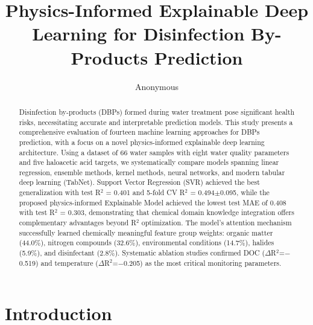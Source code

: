 \documentclass[runningheads]{llncs}
\begin{document}
\title{Physics-Informed Explainable Deep Learning for Disinfection By-Products Prediction}


\author{Anonymous}



\maketitle

\begin{abstract}
Disinfection by-products (DBPs) formed during water treatment pose significant health risks, necessitating accurate and interpretable prediction models. This study presents a comprehensive evaluation of fourteen machine learning approaches for DBPs prediction, with a focus on a novel physics-informed explainable deep learning architecture. Using a dataset of 66 water samples with eight water quality parameters and five haloacetic acid targets, we systematically compare models spanning linear regression, ensemble methods, kernel methods, neural networks, and modern tabular deep learning (TabNet). Support Vector Regression (SVR) achieved the best generalization with test R$^2$ = 0.401 and 5-fold CV R$^2$ = 0.494$\pm$0.095, while the proposed physics-informed Explainable Model achieved the lowest test MAE of 0.408 with test R$^2$ = 0.303, demonstrating that chemical domain knowledge integration offers complementary advantages beyond R$^2$ optimization. The model's attention mechanism successfully learned chemically meaningful feature group weights: organic matter (44.0\%), nitrogen compounds (32.6\%), environmental conditions (14.7\%), halides (5.9\%), and disinfectant (2.8\%). Systematic ablation studies confirmed DOC ($\Delta$R$^2$=$-$0.519) and temperature ($\Delta$R$^2$=$-$0.205) as the most critical monitoring parameters.

\end{abstract}


\section{Introduction}
\end{document}

